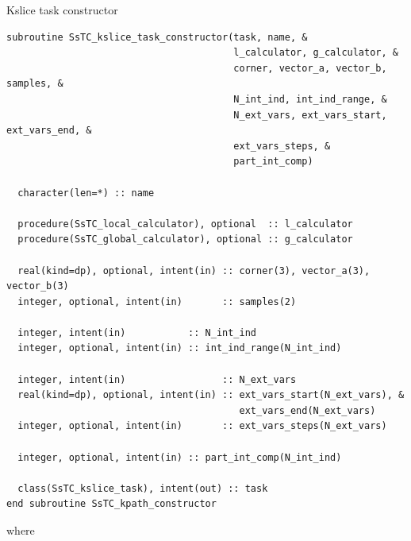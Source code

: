 \documentclass[10pt,a4paper]{article}
\begin{document}
\begin{codebox}{Kslice task constructor}
\begin{lstlisting}[caption={Interface of the kslice task constructor.},captionpos=b]
subroutine SsTC_kslice_task_constructor(task, name, &
                                        l_calculator, g_calculator, &
                                        corner, vector_a, vector_b, samples, &
                                        N_int_ind, int_ind_range, &
                                        N_ext_vars, ext_vars_start, ext_vars_end, &
                                        ext_vars_steps, &
                                        part_int_comp)

  character(len=*) :: name

  procedure(SsTC_local_calculator), optional  :: l_calculator
  procedure(SsTC_global_calculator), optional :: g_calculator

  real(kind=dp), optional, intent(in) :: corner(3), vector_a(3), vector_b(3)
  integer, optional, intent(in)       :: samples(2)

  integer, intent(in)           :: N_int_ind
  integer, optional, intent(in) :: int_ind_range(N_int_ind)

  integer, intent(in)                 :: N_ext_vars
  real(kind=dp), optional, intent(in) :: ext_vars_start(N_ext_vars), &
                                         ext_vars_end(N_ext_vars)
  integer, optional, intent(in)       :: ext_vars_steps(N_ext_vars)

  integer, optional, intent(in) :: part_int_comp(N_int_ind)

  class(SsTC_kslice_task), intent(out) :: task
end subroutine SsTC_kpath_constructor
\end{lstlisting}
\end{codebox}
where
\end{document}

